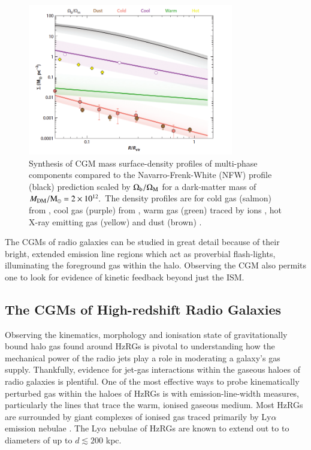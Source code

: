 \begin{figure}
 \centering
 \includegraphics[width=0.8\textwidth]{plots_chp1/CGM_missing_baryons_Tumlinson_2017}
 \caption[Multi-phase CGM mass surface-density profiles]{Synthesis of CGM mass surface-density profiles of multi-phase components compared to the Navarro-Frenk-White (NFW) profile (black) prediction scaled by $\Omega_{\rm b}/\Omega_{\rm M}$ for a dark-matter mass of $M_{\rm DM}/\rm{M}_\odot = 2\times10^{12}.$ The density profiles are for cold gas (salmon) from \citet{ZhuMenard2013a}, cool gas (purple) from \citet{Werk2014}, warm gas (green) traced by  ions \citep{Tumlinson2011,Peeples2014}, hot X-ray emitting gas (yellow) \citep{Anderson2016} and dust (brown) \citep{Menard2010}. }
 \label{fig:CGM-baryon-budget-Tumlinson2017}
\end{figure}

The CGMs of radio galaxies can be studied in great detail because of their bright, extended emission line regions which act as proverbial flash-lights, illuminating the foreground gas within the halo. Observing the CGM also permits one to look for evidence of kinetic feedback beyond just the ISM. 

\subsection{The CGMs of High-redshift Radio Galaxies } 
Observing the kinematics, morphology and ionisation state of gravitationally bound halo gas found around HzRGs is pivotal to understanding how the mechanical power of the radio jets play a role in moderating a galaxy's gas supply. Thankfully, evidence for jet-gas interactions within the gaseous haloes of radio galaxies is plentiful. One of the most effective ways to probe kinematically perturbed gas within the haloes of HzRGs is with emission-line-width measures, particularly the lines that trace the warm, ionised gaseous medium. Most HzRGs are surrounded by giant complexes of ionised gas traced primarily by Ly$\alpha$ emission nebulae \citep{mccarthy1990a,reuland2003}. The Ly$\alpha$ nebulae of HzRGs are known to extend out to to diameters of up to $d \lesssim 200$ kpc. 

